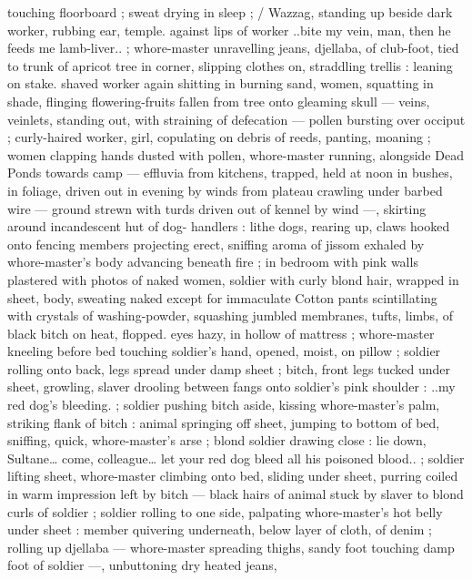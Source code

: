 touching floorboard ; sweat drying in sleep ; {\slash} Wazzag, standing up 
beside dark worker, rubbing ear, temple. against lips of worker 
{\gl}..bite my vein, man, then he feeds me lamb-liver..{\gr} ; whore-master 
unravelling jeans, djellaba, of club-foot, tied to trunk of apricot tree 
in corner, slipping clothes on, straddling trellis : leaning on stake. 
shaved worker again shitting in burning sand, women, squatting in 
shade, flinging flowering-fruits fallen from tree onto gleaming skull 
--- veins, veinlets, standing out, with straining of defecation --- 
pollen bursting over occiput ; curly-haired worker, girl, copulating on 
debris of reeds, panting, moaning ; women clapping hands dusted 
with pollen, whore-master running, alongside {\gl} Dead Ponds {\gr} 
towards camp --- effluvia from kitchens, trapped, held at noon in 
bushes, in foliage, driven out in evening by winds from plateau 
crawling under barbed wire --- ground strewn with turds driven out 
of kennel by wind ---, skirting around incandescent hut of dog- 
handlers : lithe dogs, rearing up, claws hooked onto fencing 
members projecting erect, sniffing aroma of jissom exhaled by 
whore-master's body advancing beneath fire ; in bedroom with pink 
walls plastered with photos of naked women, soldier with curly blond 
hair, wrapped in sheet, body, sweating naked except for immaculate 
Cotton pants scintillating with crystals of washing-powder, squashing 
jumbled membranes, tufts, limbs, of black bitch on heat, flopped. 
eyes hazy, in hollow of mattress ; whore-master kneeling before bed 
touching soldier's hand, opened, moist, on pillow ; soldier rolling 
onto back, legs spread under damp sheet ; bitch, front legs tucked 
under sheet, growling, slaver drooling between fangs onto soldier's 
pink shoulder : {\td} {\gl}..my red dog's bleeding.{\gr} ; soldier pushing bitch 
aside, kissing whore-master's palm, striking flank of bitch : animal 
springing off sheet, jumping to bottom of bed, sniffing, quick, 
whore-master's arse ; blond soldier drawing close : {\td} {\gl} {\td} lie down, 
Sultane{\ldots} come, colleague{\ldots} let your red dog bleed all his poisoned 
blood..{\gr} ; soldier lifting sheet, whore-master climbing onto bed, 
sliding under sheet, purring coiled in warm impression left by bitch 
--- black hairs of animal stuck by slaver to blond curls of soldier ; 
soldier rolling to one side, palpating whore-master's hot belly under 
sheet : member quivering underneath, below layer of cloth, of denim 
; rolling up djellaba --- whore-master spreading thighs, sandy foot 
touching damp foot of soldier ---, unbuttoning dry heated jeans, 
